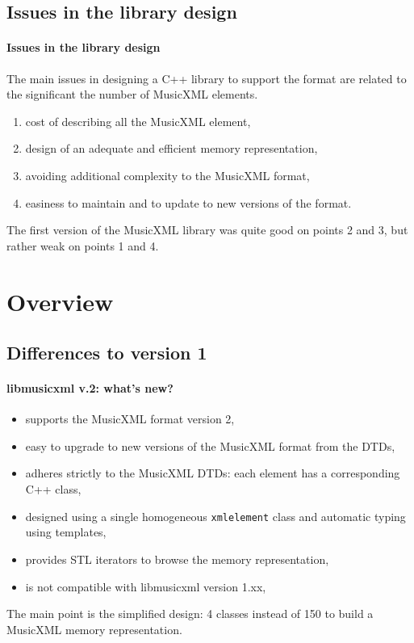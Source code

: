 \documentclass{beamer}
\begin{document}
\section{Issues in the library design}
\begin{frame}
  \frametitle{Issues in the library design}
  The main issues in designing a C++ library to support the format are related to the significant
  the number of MusicXML elements.
  \begin{enumerate}
    \item cost of describing all the MusicXML element,
    \item design of an adequate and efficient memory representation,
    \item avoiding additional complexity to the MusicXML format,
    \item easiness to maintain and to update to new versions of the format.
  \end{enumerate}

  \begin{block}{}
  The first version of the MusicXML library was quite good on points 2 and 3, but rather weak
  on points 1 and 4.
  \end{block}
\end{frame}


\chapter{Overview}
\section{Differences to version 1}
\begin{frame}
  \frametitle{libmusicxml v.2: what's new?}
  \begin{itemize}
    \item supports the MusicXML format version 2,
    \item easy to upgrade to new versions of the MusicXML format from the DTDs,
    \item adheres strictly to the MusicXML DTDs: each element has a corresponding C++ class,
    \item designed using a single homogeneous \texttt{xmlelement} class and automatic
    typing using templates,
    \item provides STL iterators to browse the memory representation,
    \item is \alert{not compatible} with libmusicxml version 1.xx,
  \end{itemize}
  \begin{block}{}
  The main point is the simplified design: 4 classes instead of 150 to build a MusicXML
  memory representation.
  \end{block}
\end{frame}
\end{document}
